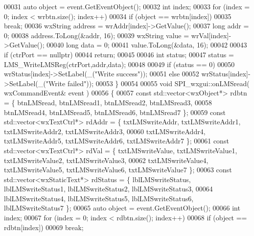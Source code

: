 \begin{DoxyCode}
00031     \textcolor{keyword}{auto} \textcolor{keywordtype}{object} = \textcolor{keyword}{event}.GetEventObject();
00032     \textcolor{keywordtype}{int} index;
00033     \textcolor{keywordflow}{for} (index = 0; index < wrbtn.size(); index++)
00034         \textcolor{keywordflow}{if} (\textcolor{keywordtype}{object} == wrbtn[index])
00035             \textcolor{keywordflow}{break};
00036     wxString address = wrAddr[index]->GetValue();
00037     \textcolor{keywordtype}{long} addr = 0;
00038     address.ToLong(&addr, 16);
00039     wxString value = wrVal[index]->GetValue();
00040     \textcolor{keywordtype}{long} data = 0;
00041     value.ToLong(&data, 16);
00042 
00043     \textcolor{keywordflow}{if} (ctrPort == \textcolor{keyword}{nullptr})
00044         \textcolor{keywordflow}{return};
00045 
00046     \textcolor{keywordtype}{int} status;
00047     status = LMS_WriteLMSReg(ctrPort,addr,data);
00048 
00049     \textcolor{keywordflow}{if} (status == 0)
00050         wrStatus[index]->SetLabel(\_(\textcolor{stringliteral}{"Write success"}));
00051     \textcolor{keywordflow}{else}
00052         wrStatus[index]->SetLabel(\_(\textcolor{stringliteral}{"Write failed"}));
00053 \}
00054 
00055 \textcolor{keywordtype}{void} SPI_wxgui::onLMSread( wxCommandEvent& event )
00056 \{
00057     \textcolor{keyword}{const} std::vector<wxObject*> rdbtn = \{ btnLMSread, btnLMSread1, btnLMSread2, 
      btnLMSread3,
00058         btnLMSread4, btnLMSread5, btnLMSread6, btnLMSread7 \};
00059     \textcolor{keyword}{const} std::vector<wxTextCtrl*> rdAddr = \{ txtLMSwriteAddr, txtLMSwriteAddr1, 
      txtLMSwriteAddr2, txtLMSwriteAddr3,
00060         txtLMSwriteAddr4, txtLMSwriteAddr5, txtLMSwriteAddr6, txtLMSwriteAddr7 \};
00061     \textcolor{keyword}{const} std::vector<wxTextCtrl*> rdVal = \{ txtLMSwriteValue, txtLMSwriteValue1, 
      txtLMSwriteValue2, txtLMSwriteValue3,
00062         txtLMSwriteValue4, txtLMSwriteValue5, txtLMSwriteValue6, 
      txtLMSwriteValue7 \};
00063     \textcolor{keyword}{const} std::vector<wxStaticText*> rdStatus = \{ lblLMSwriteStatus, 
      lblLMSwriteStatus1, lblLMSwriteStatus2, lblLMSwriteStatus3,
00064         lblLMSwriteStatus4, lblLMSwriteStatus5, lblLMSwriteStatus6, 
      lblLMSwriteStatus7 \};
00065     \textcolor{keyword}{auto} \textcolor{keywordtype}{object} = \textcolor{keyword}{event}.GetEventObject();
00066     \textcolor{keywordtype}{int} index;
00067     \textcolor{keywordflow}{for} (index = 0; index < rdbtn.size(); index++)
00068         \textcolor{keywordflow}{if} (\textcolor{keywordtype}{object} == rdbtn[index])
00069             \textcolor{keywordflow}{break};

\end{DoxyCode}
